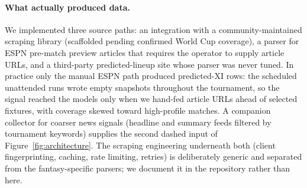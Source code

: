 \paragraph{What actually produced data.}
We implemented three source paths: an integration with a
community-maintained scraping library (scaffolded pending confirmed
World Cup coverage), a parser for ESPN pre-match preview articles
that requires the operator to supply article URLs, and a third-party
predicted-lineup site whose parser was never tuned. In practice only
the manual ESPN path produced predicted-XI rows: the scheduled
unattended runs wrote empty snapshots throughout the tournament, so
the signal reached the models only when we hand-fed article URLs
ahead of selected fixtures, with coverage skewed toward high-profile
matches. A companion collector for coarser news signals (headline
and summary feeds filtered by tournament keywords) supplies the
second dashed input of Figure~\ref{fig:architecture}. The scraping
engineering underneath both (client fingerprinting, caching, rate
limiting, retries) is deliberately generic and separated from the
fantasy-specific parsers; we document it in the repository rather
than here.
